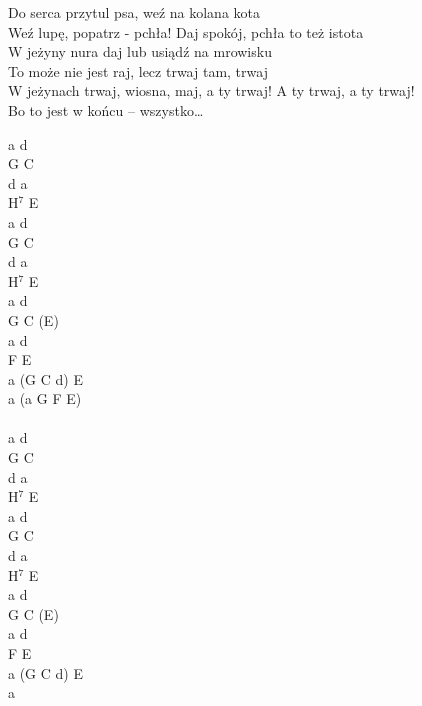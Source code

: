 \documentclass[a5paper, 10pt]{book}
\begin{document}
\begin{minipage}[t]{0.8\textwidth}
\hspace*{5mm}Do serca przytul psa, weź na kolana kota\\
\hspace*{5mm}Weź lupę, popatrz - pchła! Daj spokój, pchła to też istota\\
\hspace*{5mm}W jeżyny nura daj lub usiądź na mrowisku\\
\hspace*{5mm}To może nie jest raj, lecz trwaj tam, trwaj\\
\hspace*{5mm}W jeżynach trwaj, wiosna, maj, a ty trwaj! A ty trwaj, a ty trwaj!\\
\hspace*{5mm}Bo to jest w końcu – wszystko…\\
\end{minipage}
\begin{minipage}[t]{0.2\textwidth}
 a d\\
 G C\\
 d a\\
 H$^7$ E\\

 a d\\
 G C\\
 d a\\
 H$^7$ E\\
 
 a d\\
 G C (E)\\
 a d\\
 F E\\
 a (G C d) E\\
 a (a G F E)\\
\vspace*{10mm}\\
 a d\\
 G C\\
 d a\\
 H$^7$ E\\

  a d\\
 G C\\
 d a\\
 H$^7$ E\\

  a d\\
 G C (E)\\
 a d\\
 F E\\
 a (G C d) E\\
 a \\
\end{minipage}
\end{document}
